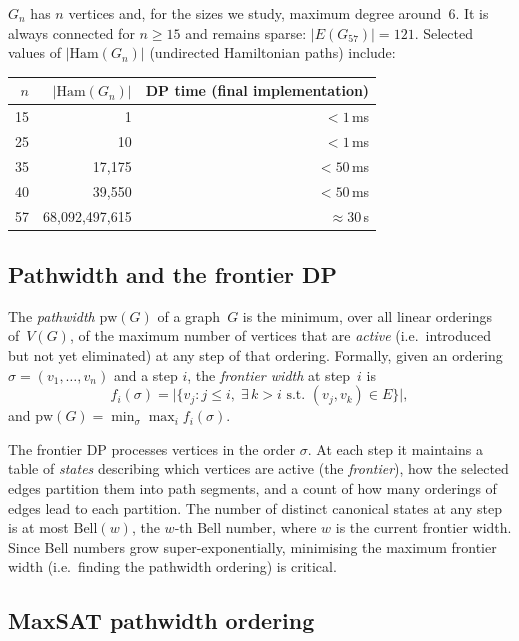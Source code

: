 \documentclass[12pt]{article}
\theoremstyle{definition}
\newcommand{\Gn}{G_n}
\newcommand{\pw}{\mathrm{pw}}
\newcommand{\Bell}{\mathrm{Bell}}
\begin{document}
$\Gn$ has $n$ vertices and, for the sizes we study, maximum degree around~$6$.
It is always connected for $n \ge 15$ and remains sparse: $|E(G_{57})| = 121$.
Selected values of $|\text{Ham}(G_n)|$ (undirected Hamiltonian paths) include:

\begin{center}
\begin{tabular}{rrr}
\toprule
$n$ & $|\text{Ham}(G_n)|$ & DP time (final implementation)\\
\midrule
15 & 1 & $<1$\,ms\\
25 & 10 & $<1$\,ms\\
35 & 17{,}175 & $<50$\,ms\\
40 & 39{,}550 & $<50$\,ms\\
57 & 68{,}092{,}497{,}615 & $\approx 30$\,s\\
\bottomrule
\end{tabular}
\end{center}

\subsection{Pathwidth and the frontier DP}
\label{sec:frontier}

The \emph{pathwidth} $\pw(G)$ of a graph~$G$ is the minimum, over all linear
orderings of~$V(G)$, of the maximum number of vertices that are
\emph{active} (i.e.\ introduced but not yet eliminated) at any step of
that ordering.
Formally, given an ordering $\sigma = (v_1,\ldots,v_n)$ and a step $i$,
the \emph{frontier width} at step~$i$ is
\[
  f_i(\sigma) = \bigl|\{v_j : j \le i,\; \exists\, k > i \text{ s.t.\ }(v_j,v_k)\in E\}\bigr|,
\]
and $\pw(G) = \min_\sigma \max_i f_i(\sigma)$.

The frontier DP processes vertices in the order $\sigma$.
At each step it maintains a table of \emph{states} describing which vertices
are active (the \emph{frontier}), how the selected edges partition them into
path segments, and a count of how many orderings of edges lead to each partition.
The number of distinct canonical states at any step is at most $\Bell(w)$,
the $w$-th Bell number, where $w$ is the current frontier width.
Since Bell numbers grow super-exponentially, minimising the maximum frontier
width (i.e.\ finding the pathwidth ordering) is critical.

\subsection{MaxSAT pathwidth ordering}
\label{sec:ordering}
\end{document}
